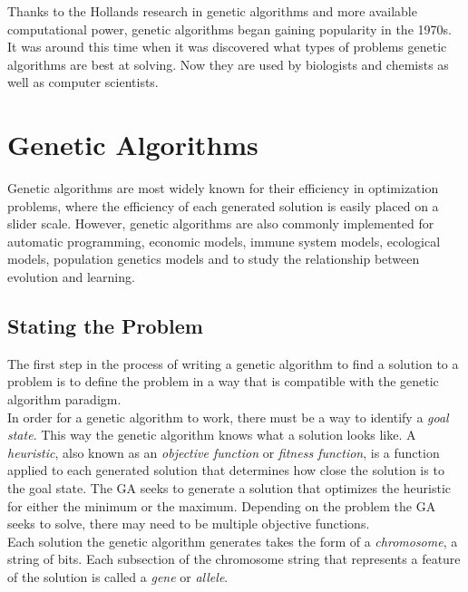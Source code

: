 \documentclass[a4paper]{article}
\begin{document}
Thanks to the Hollands research in genetic algorithms and more available computational power, genetic algorithms began gaining popularity in the 1970s. It was around this time when it was discovered what types of problems genetic algorithms are best at solving. Now they are used by biologists and chemists as well as computer scientists.

\section{Genetic Algorithms}
Genetic algorithms are most widely known for their efficiency in optimization problems, where the efficiency of each generated solution is easily placed on a slider scale. However, genetic algorithms are also commonly implemented for automatic programming, economic models, immune system models, ecological models, population genetics models and to study the relationship between evolution and learning.\cite{overview}\\

\subsection{Stating the Problem}
The first step in the process of writing a genetic algorithm to find a solution to a problem is to define the problem in a way that is compatible with the genetic algorithm paradigm.\\

In order for a genetic algorithm to work, there must be a way to identify a \textit{goal state}. This way the genetic algorithm knows what a solution looks like. A \textit{heuristic}, also known as an \textit{objective function} or \textit{fitness function}, is a function applied to each generated solution that determines how close the solution is to the goal state. The GA seeks to generate a solution that optimizes the heuristic for either the minimum or the maximum. Depending on the problem the GA seeks to solve, there may need to be multiple objective functions.\\

Each solution the genetic algorithm generates takes the form of a \textit{chromosome}, a string of bits. Each subsection of the chromosome string that represents a feature of the solution is called a \textit{gene} or \textit{allele}.\\
\end{document}
